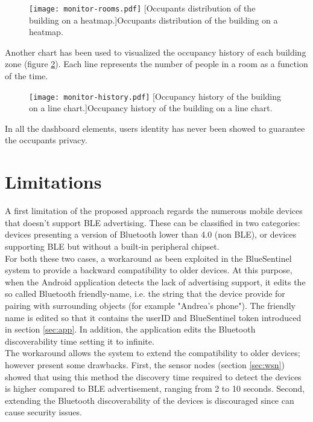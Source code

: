 \begin{figure}[h!tb]
\center
\texttt{[image: monitor-rooms.pdf]}
[Occupants distribution of the building on a heatmap.]{Occupants distribution of the building on a heatmap.}
\label{fig:monitor-rooms}
\end{figure}

Another chart has been used to visualized the occupancy history of each building zone (figure \ref{fig:monitor-history}). Each line represents the number of people in a room as a function of the time.

\begin{figure}[h!tb]
\center
\texttt{[image: monitor-history.pdf]}
[Occupancy history of the building on a line chart.]{Occupancy history of the building on a line chart.}
\label{fig:monitor-history}
\end{figure}

In all the dashboard elements, users identity has never been showed to guarantee the occupants privacy.


\section{Limitations}
\label{sec:limitations}
A first limitation of the proposed approach regards the numerous mobile devices that doesn't support BLE advertising. These can be classified in two categories: devices presenting a version of Bluetooth lower than 4.0 (non BLE), or devices supporting BLE but without a built-in peripheral chipset.\\
For both these two cases, a workaround as been exploited in the BlueSentinel system to provide a backward compatibility to older devices. At this purpose, when the Android application detects the lack of advertising support, it edits the so called Bluetooth friendly-name, i.e. the string that the device provide for pairing with surrounding objects (for example "Andrea's phone"). The friendly name is edited so that it contains the userID and BlueSentinel token introduced in section \ref{sec:app}. In addition, the application edits the Bluetooth discoverability time setting it to infinite.\\
The workaround allows the system to extend the compatibility to older devices; however present some drawbacks. First, the sensor nodes (section \ref{sec:wsn}) showed that using this method the discovery time required to detect the devices is higher compared to BLE advertisement, ranging from 2 to 10 seconds. Second, extending the Bluetooth discoverability of the devices is discouraged since can cause security issues.

